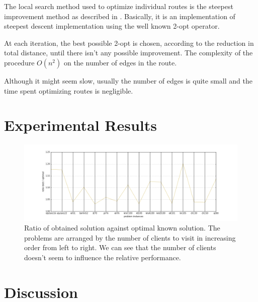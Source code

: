 \documentclass{article} %
\begin{document}
The local search method used to optimize individual routes is the steepest improvement method as described in \citep{steepest_improvement}.
Basically, it is an implementation of steepest descent implementation using the well known 2-opt operator.\newline

At each iteration, the best possible 2-opt is chosen, according to the reduction in total distance, until there isn't any possible improvement. The complexity of the procedure $O(n^{2})$ on the number of edges in the route.\newline

Although it might seem slow, usually the number of edges is quite small and the time spent optimizing routes is negligible.\newline


\newpage
\section{Experimental Results}
\label{exp_results}

\begin{figure}[!htb]
\begin{center}
\includegraphics[scale=0.4]{figs/ratios}
\caption{\small Ratio of obtained solution against optimal known solution. The problems are arranged by the number of clients to visit in increasing order from left to right. We can see that the number of clients doesn't seem to influence the relative performance.}
\end{center}

\end{figure}






\newpage
\section{Discussion}
\end{document}
